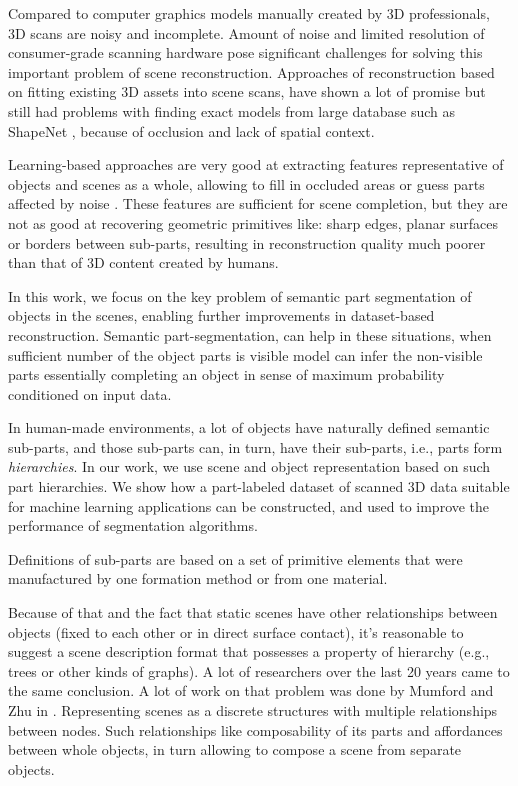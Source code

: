 Compared to computer graphics models manually created by 3D professionals, 3D scans are noisy and incomplete.
Amount of noise and limited resolution of consumer-grade scanning hardware pose significant challenges for solving this important problem of scene reconstruction. 
Approaches of reconstruction based on fitting existing 3D assets into scene scans, have shown a lot of promise but still had problems with finding exact models from large database such as ShapeNet \cite{chang2015shapenet}, because of occlusion and lack of spatial context.

Learning-based approaches are very good at extracting features representative of objects and scenes as a whole, allowing to fill in occluded areas or guess parts affected by noise \cite{dai2017shape,dai2018scancomplete,song2017semantic}. These features are sufficient for scene completion, but they are not as good at recovering geometric primitives like: sharp edges, planar surfaces or borders between sub-parts, resulting in reconstruction quality much poorer than that of 3D content created by humans.

In this work, we focus on the key problem of semantic part segmentation of objects in the scenes, enabling further improvements in  dataset-based reconstruction. 
Semantic part-segmentation, can help in these situations, when sufficient number of the object parts is visible model can infer the non-visible parts essentially completing an object in sense of maximum probability conditioned on input data.

In human-made environments, a lot of objects have naturally defined semantic sub-parts, and those sub-parts can, in turn, have their sub-parts, i.e., parts form \emph{hierarchies}.  In our work, we use scene and object representation based on such part hierarchies.  We show how a part-labeled dataset of scanned 3D data suitable for machine learning applications can be constructed, and used to improve the performance of segmentation algorithms. 

Definitions of sub-parts are based on a set of primitive elements that were manufactured by one formation method or from one material.

Because of that and the fact that static scenes have other relationships between objects (fixed to each other or in direct surface contact), it's reasonable to suggest a scene description format that possesses a property of hierarchy (e.g., trees or other kinds of graphs).
A lot of researchers over the last 20 years came to the same conclusion. A lot of work on that problem was done by Mumford and Zhu in \cite{zhu2006stochastic}.
Representing scenes as a discrete structures with multiple relationships between nodes. Such relationships like composability of its parts and affordances between whole objects, in turn allowing to compose a scene from separate objects.


